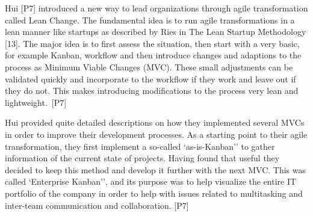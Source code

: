 Hui [P7] introduced a new way to lead organizations through agile
transformation called Lean Change. The fundamental idea is to run agile
transformations in a lean manner like startups as described by Ries in
The Lean Startup Methodology [13]. The major idea is to first assess the
situation, then start with a very basic, for example Kanban, workflow
and then introduce changes and adaptions to the process as Minimum
Viable Changes (MVC). These small adjustments can be validated quickly
and incorporate to the workflow if they work and leave out if they do
not. This makes introducing modifications to the process very lean and
lightweight. [P7]

Hui provided quite detailed descriptions on how they implemented several
MVCs in order to improve their development processes. As a starting
point to their agile transformation, they first implement a so-called
`as-is-Kanban'' to gather information of the current state of projects.
Having found that useful they decided to keep this method and develop it
further with the next MVC\@. This was called `Enterprise Kanban'', and
its purpose was to help visualize the entire IT portfolio of the company
in order to help with issues related to multitasking and inter-team
communication and collaboration. [P7]
